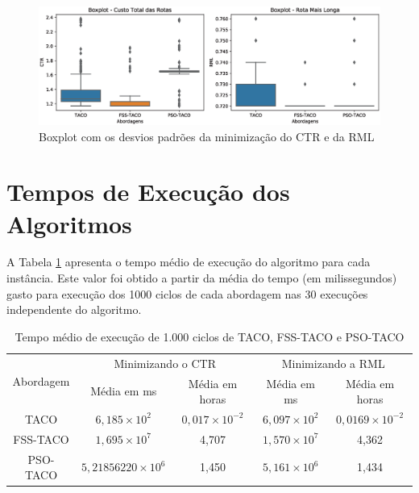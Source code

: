 \begin{figure}[!htb]
    \centering
    \caption{Boxplot com os desvios padrões da minimização do CTR e da RML} \label{fig:resultados-boxplot}
    \includegraphics[width=\textwidth]{imagens/boxplot-approaches.eps}
\end{figure}

\section{Tempos de Execução dos Algoritmos}
\label{sec-resultados-tempo}

A Tabela \ref{tab:resultado-tempo} apresenta o tempo médio de execução do algoritmo para cada instância. Este valor foi obtido a partir da média do tempo (em milissegundos) gasto para execução dos 1000 ciclos de cada abordagem nas 30 execuções independente do algoritmo.

\begin{table}[htb]
    \centering
    \caption{Tempo médio de execução de 1.000 ciclos de TACO, FSS-TACO e PSO-TACO} \label{tab:resultado-tempo}
    \begin{tabular}{|c|c|c|c|c|}
    \hline
    \multirow{2}{*}{Abordagem} & \multicolumn{2}{c|}{Minimizando o CTR} & \multicolumn{2}{c|}{Minimizando a RML}          \\ \cline{2-5} 
                               & Média em ms & Média em horas  & Média em ms & Média em horas  \\ \hline
    TACO                       & $6,185 \times 10^2$     &$0,017 \times 10^{-2}$       & $6,097 \times 10^2$ &$0,0169 \times 10^{-2}$            \\ \hline
    FSS-TACO                   & $1,695 \times 10^7$  &4,707     & $1,570 \times 10^7$ &4,362      \\ \hline
    PSO-TACO                   & $5,21856220 \times 10^6$  &1,450     & $5,161 \times 10^6$    &1,434    \\ \hline
    \end{tabular}
\end{table}

